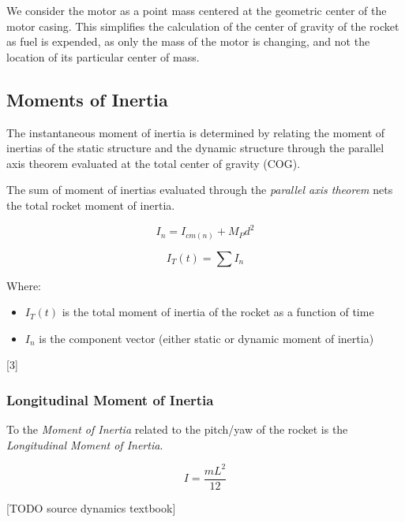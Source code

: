\documentclass[]{book}
\providecommand{\tightlist}{%
  \setlength{\itemsep}{0pt}\setlength{\parskip}{0pt}}
\begin{document}
We consider the motor as a point mass centered at the geometric center
of the motor casing. This simplifies the calculation of the center of
gravity of the rocket as fuel is expended, as only the mass of the motor
is changing, and not the location of its particular center of mass.

\subsection{Moments of Inertia}\label{moments-of-inertia}

The instantaneous moment of inertia is determined by relating the moment
of inertias of the static structure and the dynamic structure through
the parallel axis theorem evaluated at the total center of gravity
(COG).

The sum of moment of inertias evaluated through the \emph{parallel axis
theorem} nets the total rocket moment of inertia.

\begin{equation}
\label{eq_parallel_axis_theorem}
I_n = I_{cm(n)} + M_P d^2 
\end{equation}

\begin{equation}
I_T(t) = \sum I_n 
\end{equation}

Where:

\begin{itemize}
\tightlist
\item
  \(I_T(t)\) is the total moment of inertia of the rocket as a function
  of time
\item
  \(I_n\) is the component vector (either static or dynamic moment of
  inertia)
\end{itemize}

{[}3{]}

\subsubsection{Longitudinal Moment of
Inertia}\label{longitudinal-moment-of-inertia}

To the \emph{Moment of Inertia} related to the pitch/yaw of the rocket
is the \emph{Longitudinal Moment of Inertia}.

\begin{equation}
\label{longitudinal_moment_inertia}
I = \dfrac{mL^2}{12}
\end{equation}

{[}TODO source dynamics textbook{]}
\end{document}
